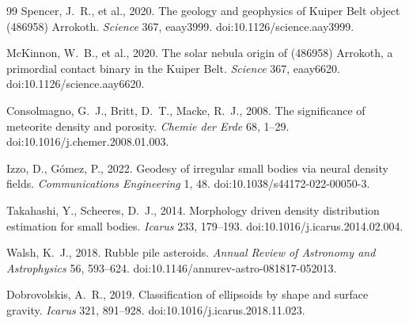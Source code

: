 \documentclass[11pt,a4paper]{article}
\begin{document}
\begin{thebibliography}{99}
Spencer, J.~R., et al., 2020. The geology and geophysics of Kuiper Belt
object (486958) Arrokoth. \emph{Science} 367, eaay3999.
doi:10.1126/science.aay3999.

McKinnon, W.~B., et al., 2020. The solar nebula origin of (486958)
Arrokoth, a primordial contact binary in the Kuiper Belt. \emph{Science}
367, eaay6620. doi:10.1126/science.aay6620.

Consolmagno, G.~J., Britt, D.~T., Macke, R.~J., 2008. The significance of
meteorite density and porosity. \emph{Chemie der Erde} 68, 1--29.
doi:10.1016/j.chemer.2008.01.003.

Izzo, D., G\'omez, P., 2022. Geodesy of irregular small bodies via neural
density fields. \emph{Communications Engineering} 1, 48.
doi:10.1038/s44172-022-00050-3.

Takahashi, Y., Scheeres, D.~J., 2014. Morphology driven density
distribution estimation for small bodies. \emph{Icarus} 233, 179--193.
doi:10.1016/j.icarus.2014.02.004.

Walsh, K.~J., 2018. Rubble pile asteroids. \emph{Annual Review of
Astronomy and Astrophysics} 56, 593--624.
doi:10.1146/annurev-astro-081817-052013.

Dobrovolskis, A.~R., 2019. Classification of ellipsoids by shape
and surface gravity. \emph{Icarus} 321, 891--928.
doi:10.1016/j.icarus.2018.11.023.

\end{thebibliography}
\end{document}
